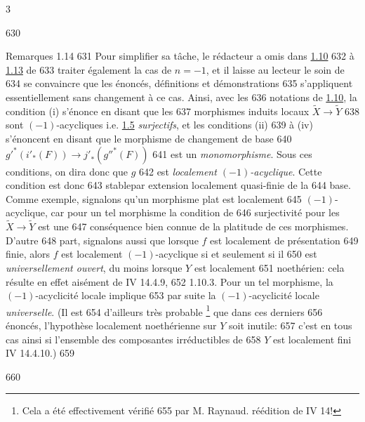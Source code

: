 3	\documentclass[10pt]{../fichiers-configuration-latex/smfart}
\begin{document}
   630	\begin{enonce*}[remark]{Remarques 1.14}
   631	Pour simplifier sa tâche, le rédacteur a omis dans \hyperref[XV.prop1.10]{1.10} 
   632	à \hyperref[XV.prop1.13]{1.13} de
   633	traiter également la cas de $n=-1$, et il laisse au lecteur le soin de
   634	se convaincre que les énoncés, définitions et démonstrations
   635	s'appliquent essentiellement sans changement à ce cas. Ainsi, avec les
   636	notations de \hyperref[XV.prop1.10]{1.10}, la condition (i) s'énonce en disant que les
   637	morphismes induits locaux $\widetilde{X}\rightarrow \widetilde{Y}$
   638	sont $(-1)$-acycliques i.e. \hyperref[XV.cor1.5]{1.5} \emph{surjectifs}, et les conditions (ii)
   639	à (iv) s'énoncent en disant que le morphisme de changement de base
   640	${g'}^{\ast}({i'}_{\ast}(F))\rightarrow {j'}_{\ast}({g''}^{\ast}(F))$
   641	est un \emph{monomorphisme}. Sous ces conditions, on dira donc que $g$
   642	est \emph{localement $(-1)$-acyclique}. Cette condition est donc
   643	stable\pageoriginale par extension localement quasi-finie de la
   644	base. Comme exemple, signalons qu'un morphisme plat est localement
   645	$(-1)$-acyclique, car pour un tel morphisme la condition de
   646	surjectivité pour les $\widetilde{X}\rightarrow \widetilde{Y}$ est une
   647	conséquence bien connue de la platitude de ces morphismes. D'autre
   648	part, signalons aussi que lorsque $f$ est localement de présentation
   649	finie, alors $f$ est localement $(-1)$-acyclique si et seulement si il
   650	est \emph{universellement ouvert}, du moins lorsque $Y$ est localement
   651	noethérien: cela résulte en effet aisément de \EGA IV 14.4.9,
   652	1.10.3. Pour un tel morphisme, la $(-1)$-acyclicité locale implique
   653	par suite la $(-1)$-acyclicité locale \emph{universelle}. (Il est
   654	d'ailleurs très probable \footnote[1]{Cela a été effectivement vérifié
   655	par M. Raynaud. \Cf réédition de \EGA IV 14!} que dans ces derniers
   656	énoncés, l'hypothèse localement noethérienne sur $Y$ soit inutile:
   657	c'est en tous cas ainsi si l'ensemble des composantes irréductibles de
   658	$Y$ est localement fini \EGA IV 14.4.10.)
   659	\end{enonce*}
   660	
\end{document}

